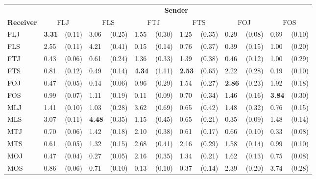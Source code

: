 
\begin{tabular}{ll@{\,\,\,}rl@{\,\,\,}rl@{\,\,\,}rl@{\,\,\,}rl@{\,\,\,}rl@{\,\,\,}r}
\toprule
    & \multicolumn{12}{c}{\textbf{Sender}} \\
    \cmidrule(lr){2- 13 }
\textbf{Receiver}
    & \multicolumn{2}{c}{\textnormal{FLJ}}
    & \multicolumn{2}{c}{\textnormal{FLS}}
    & \multicolumn{2}{c}{\textnormal{FTJ}}
    & \multicolumn{2}{c}{\textnormal{FTS}}
    & \multicolumn{2}{c}{\textnormal{FOJ}}
    & \multicolumn{2}{c}{\textnormal{FOS}} \\
    \cmidrule(lr){1-1}
    \cmidrule(lr){2-3}
    \cmidrule(lr){4-5}
    \cmidrule(lr){6-7}
    \cmidrule(lr){8-9}
    \cmidrule(lr){10-11}
    \cmidrule(lr){12-13}
    \textnormal{FLJ} & \textbf{3.31} & (0.11) & 3.06 & (0.25) & 1.55 & (0.30) & 1.25 & (0.35) & 0.29 & (0.08) & 0.69 & (0.10) \\
    \textnormal{FLS} & 2.55 & (0.11) & 4.21 & (0.41) & 0.15 & (0.14) & 0.76 & (0.37) & 0.39 & (0.15) & 1.00 & (0.20) \\
    \textnormal{FTJ} & 0.43 & (0.06) & 0.61 & (0.24) & 1.36 & (0.33) & 1.39 & (0.38) & 0.46 & (0.12) & 1.00 & (0.29) \\
    \textnormal{FTS} & 0.81 & (0.12) & 0.49 & (0.14) & \textbf{4.34} & (1.11) & \textbf{2.53} & (0.65) & 2.22 & (0.28) & 0.19 & (0.10) \\
    \textnormal{FOJ} & 0.47 & (0.05) & 0.14 & (0.06) & 0.96 & (0.29) & 1.54 & (0.27) & \textbf{2.86} & (0.23) & 1.92 & (0.18) \\
    \textnormal{FOS} & 0.99 & (0.07) & 1.11 & (0.19) & 0.11 & (0.09) & 0.70 & (0.34) & 1.46 & (0.16) & \textbf{3.84} & (0.30) \\
    \textnormal{MLJ} & 1.41 & (0.10) & 1.03 & (0.28) & 3.62 & (0.69) & 0.65 & (0.42) & 1.48 & (0.32) & 0.76 & (0.15) \\
    \textnormal{MLS} & 3.07 & (0.11) & \textbf{4.48} & (0.35) & 1.15 & (0.45) & 0.65 & (0.21) & 0.35 & (0.09) & 1.48 & (0.14) \\
    \textnormal{MTJ} & 0.70 & (0.06) & 1.42 & (0.18) & 2.10 & (0.38) & 0.61 & (0.17) & 0.66 & (0.10) & 0.33 & (0.08) \\
    \textnormal{MTS} & 0.61 & (0.05) & 1.32 & (0.15) & 2.68 & (0.41) & 2.16 & (0.29) & 1.58 & (0.14) & 0.99 & (0.10) \\
    \textnormal{MOJ} & 0.47 & (0.04) & 0.27 & (0.05) & 2.16 & (0.35) & 1.34 & (0.21) & 1.62 & (0.13) & 0.75 & (0.08) \\
    \textnormal{MOS} & 0.86 & (0.06) & 0.71 & (0.10) & 0.13 & (0.10) & 0.37 & (0.14) & 2.39 & (0.20) & 3.74 & (0.28) \\

\end{tabular}
